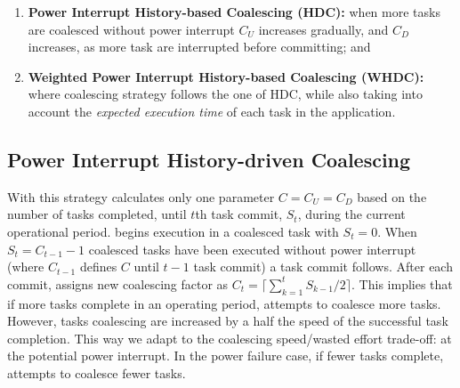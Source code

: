 \begin{enumerate}
	\item \textbf{Power Interrupt History-based Coalescing (HDC):} when more tasks are coalesced without power interrupt $C_U$ increases gradually, and $C_D$ increases, as more task are interrupted before committing; and 
	\item \textbf{Weighted Power Interrupt History-based Coalescing (WHDC):} where coalescing strategy follows the one of HDC, while also taking into account the \emph{expected execution time} of each task in the application.
\end{enumerate}

\subsection{Power Interrupt History-driven Coalescing}

With this strategy \sys calculates only one parameter $C=C_U=C_D$ based on the number of tasks completed, until $t$th task commit, $S_t$, during the current operational period. \sys begins execution in a coalesced task with $S_t=0$. When $S_t=C_{t-1}-1$ coalesced tasks have been executed without power interrupt (where $C_{t-1}$ defines $C$ until $t-1$ task commit) a task commit follows. After each commit, \sys assigns new coalescing factor as $C_{t}=\lceil \sum_{k=1}^{t}S_{k-1}/2\rceil$. This implies that if more tasks complete in an operating period, \sys attempts to coalesce more tasks. However, tasks coalescing are increased by a half the speed of the successful task completion. This way we adapt to the coalescing speed/wasted effort trade-off: at the potential power interrupt. In the power failure case, if fewer tasks complete, \sys attempts to coalesce fewer tasks.


